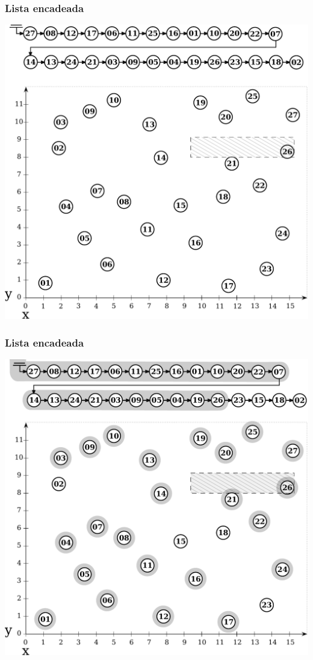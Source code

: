 \documentclass[10pt,xcolor=table,fleqn]{beamer}
\begin{document}
\begin{frame}
  \frametitle{Lista encadeada}
  \begin{center}
    \includegraphics[scale=0.3]{../img/points-query/lst/points-lst-model}
  \end{center}
\end{frame}

\begin{frame}
  \frametitle{Lista encadeada}
  \begin{center}
    \includegraphics[scale=0.3]{../img/points-query/lst/points-lst-query}
  \end{center}
\end{frame}
\end{document}
